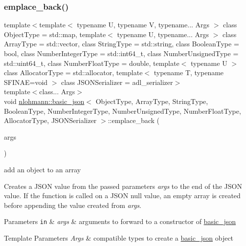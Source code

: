 \subsubsection{\texorpdfstring{emplace\+\_\+back()}{emplace\_back()}}
{\footnotesize\ttfamily template$<$template$<$ typename U, typename V, typename... Args $>$ class Object\+Type = std\+::map, template$<$ typename U, typename... Args $>$ class Array\+Type = std\+::vector, class String\+Type  = std\+::string, class Boolean\+Type  = bool, class Number\+Integer\+Type  = std\+::int64\+\_\+t, class Number\+Unsigned\+Type  = std\+::uint64\+\_\+t, class Number\+Float\+Type  = double, template$<$ typename U $>$ class Allocator\+Type = std\+::allocator, template$<$ typename T, typename S\+F\+I\+N\+A\+E=void $>$ class J\+S\+O\+N\+Serializer = adl\+\_\+serializer$>$ \\
template$<$class... Args$>$ \\
void \mbox{\hyperlink{classnlohmann_1_1basic__json}{nlohmann\+::basic\+\_\+json}}$<$ Object\+Type, Array\+Type, String\+Type, Boolean\+Type, Number\+Integer\+Type, Number\+Unsigned\+Type, Number\+Float\+Type, Allocator\+Type, J\+S\+O\+N\+Serializer $>$\+::emplace\+\_\+back (\begin{DoxyParamCaption}\item[{Args \&\&...}]{args }\end{DoxyParamCaption})\hspace{0.3cm}{\ttfamily [inline]}}



add an object to an array 

Creates a J\+S\+ON value from the passed parameters {\itshape args} to the end of the J\+S\+ON value. If the function is called on a J\+S\+ON null value, an empty array is created before appending the value created from {\itshape args}.


\begin{DoxyParams}[1]{Parameters}
\mbox{\tt in}  & {\em args} & arguments to forward to a constructor of \mbox{\hyperlink{classnlohmann_1_1basic__json}{basic\+\_\+json}} \\
\hline
\end{DoxyParams}

\begin{DoxyTemplParams}{Template Parameters}
{\em Args} & compatible types to create a \mbox{\hyperlink{classnlohmann_1_1basic__json}{basic\+\_\+json}} object\\
\hline
\end{DoxyTemplParams}

